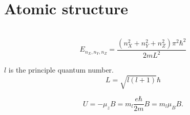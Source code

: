 \documentclass[nobib,notoc]{tufte-handout}
\begin{document}
\section{Atomic structure}
\begin{defi}
	\,
	\begin{equation*}
		E_{n_X,n_Y,n_Z}=\frac{(n_X^2+n_Y^2+n_Z^2)\pi^2\hbar^2}{2mL^2}
	\end{equation*}
\end{defi}
\begin{defi}
	\(l\) is the principle quantum number.
	\begin{equation*}
		L=\sqrt{l(l+1)}\hbar
	\end{equation*}
\end{defi}
\begin{defi}
	\begin{equation*}
		U=-\mu_zB=m_l\frac{e\hbar}{2m}B=m_l\mu_BB.
	\end{equation*}
\end{defi}
\end{document}
